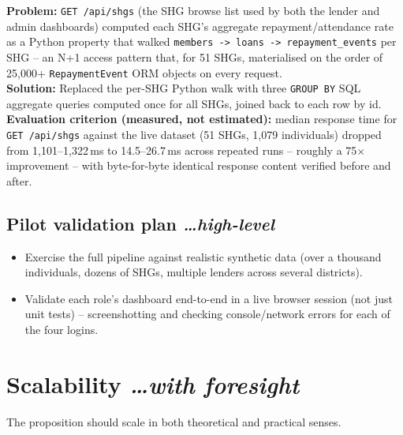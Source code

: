 \documentclass[11pt,a4paper]{article}
\newcommand{\BvrHint}[1]{%
  {\normalfont\normalsize\itshape\hfill #1}}
\begin{document}
\medskip
\textbf{Problem:} \texttt{GET /api/shgs} (the SHG browse list
used by both the lender and admin dashboards) computed each
SHG's aggregate repayment/attendance rate as a Python
property that walked \texttt{members -> loans ->
repayment\_events} per SHG -- an N+1 access pattern that, for
51 SHGs, materialised on the order of 25{,}000+
\texttt{RepaymentEvent} ORM objects on every request.\\
\textbf{Solution:} Replaced the per-SHG Python walk with
three \texttt{GROUP BY} SQL aggregate queries computed once
for all SHGs, joined back to each row by id.\\
\textbf{Evaluation criterion (measured, not estimated):}
median response time for \texttt{GET /api/shgs} against the
live dataset (51 SHGs, 1{,}079 individuals) dropped from
1{,}101--1{,}322\,ms to 14.5--26.7\,ms across repeated runs
-- roughly a 75$\times$ improvement -- with byte-for-byte
identical response content verified before and after.

\subsection{Pilot validation plan %
\BvrHint{\ldots high-level}}
\begin{itemize}[leftmargin=0.7cm]
    \item Exercise the full pipeline against realistic
    synthetic data (over a thousand individuals, dozens of
    SHGs, multiple lenders across several districts).
    \item Validate each role's dashboard end-to-end in a
    live browser session (not just unit tests) --
    screenshotting and checking console/network errors
    for each of the four logins.
\end{itemize}

\section{Scalability %
\BvrHint{\ldots with foresight}}
The proposition should scale in both theoretical and
practical senses.
\end{document}
